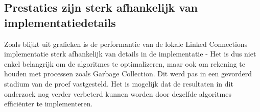 \subsection{Prestaties zijn sterk afhankelijk van implementatiedetails}
Zoals blijkt uit grafieken %
is de performantie van de lokale Linked Connections implementatie sterk afhankelijk van details in de implementatie - Het is dus niet enkel belangrijk om de algoritmes te optimalizeren, maar ook om rekening te houden met processen zoals Garbage Collection. Dit werd pas in een gevorderd stadium van de proef vastgesteld. Het is mogelijk dat de resultaten in dit onderzoek nog verder verbeterd kunnen worden door dezelfde algoritmes efficiënter te implementeren.